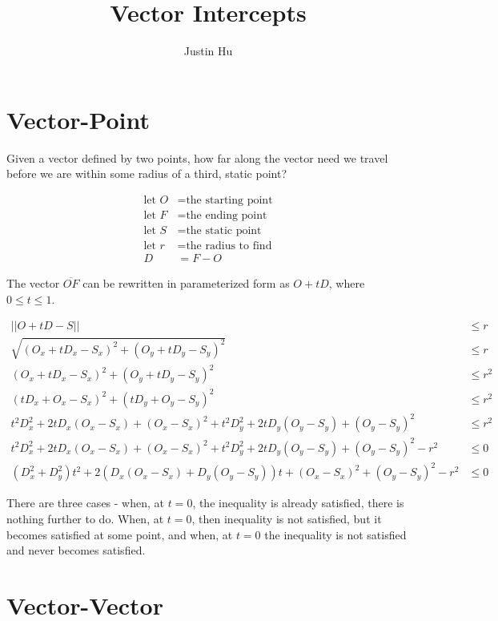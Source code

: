 \documentclass[letterpaper,12pt]{article}
\begin{document}
\title{Vector Intercepts}
\author{Justin Hu}
\maketitle

\section{Vector-Point}

Given a vector defined by two points, how far along the vector need we travel before we are within some radius of a third, static point?

\begin{align}
\textrm{let } O &= \textrm{the starting point}\\
\textrm{let } F &= \textrm{the ending point}\\
\textrm{let } S &= \textrm{the static point}\\
\textrm{let } r &= \textrm{the radius to find}\\
D &= F - O
\end{align}

The vector \(\overline{OF}\) can be rewritten in parameterized form as \(O + tD\), where \(0 \leq t \leq 1\).

\begin{align}
||O + tD - S|| &\leq r\\
\sqrt{(O_x + tD_x - S_x)^2 + (O_y + tD_y - S_y)^2} &\leq r\\
(O_x + tD_x - S_x)^2 + (O_y + tD_y - S_y)^2 &\leq r^2\\
(tD_x + O_x - S_x)^2 + (tD_y + O_y - S_y)^2 &\leq r^2\\
t^2D_x^2 + 2tD_x(O_x - S_x) + (O_x - S_x)^2 + t^2D_y^2 + 2tD_y(O_y - S_y) + (O_y - S_y)^2 &\leq r^2\\
t^2D_x^2 + 2tD_x(O_x - S_x) + (O_x - S_x)^2 + t^2D_y^2 + 2tD_y(O_y - S_y) + (O_y - S_y)^2 - r^2 &\leq 0\\
(D_x^2 + D_y^2)t^2 + 2(D_x(O_x - S_x) + D_y(O_y - S_y))t + (O_x - S_x)^2 + (O_y - S_y)^2 - r^2 &\leq 0
\end{align}

There are three cases - when, at \(t = 0\), the inequality is already satisfied, there is nothing further to do. When, at \(t = 0\), then inequality is not satisfied, but it becomes satisfied at some point, and when, at \(t = 0\) the inequality is not satisfied and never becomes satisfied.

\section{Vector-Vector}
\end{document}
